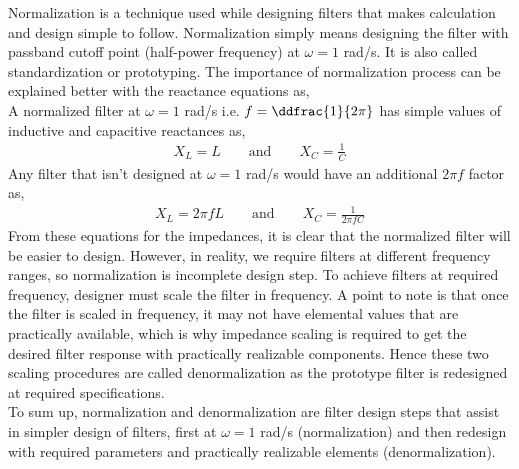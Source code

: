 
    Normalization is a technique used while designing filters that makes calculation and design simple to follow. Normalization simply means designing the filter with passband cutoff point (half-power frequency) at $\omega=1$ rad/s. It is also called standardization or prototyping. The importance of normalization process can be explained better with the reactance equations as,
\\ A normalized filter at $\omega=1$ rad/s i.e. $f=\ddfrac{1}{2\pi}$ has simple values of inductive and capacitive reactances as,
\begin{equation*}
    \begin{aligned}
        X_L=L \quad \quad \text{and} \quad \quad X_C=\frac{1}{C}
    \end{aligned}
\end{equation*}
Any filter that isn't designed at $\omega=1$ rad/s would have an additional $2\pi f$ factor as,
\begin{equation*}
    \begin{aligned}
        X_L=2\pi fL \quad \quad \text{and} \quad \quad X_C=\frac{1}{2\pi fC}
    \end{aligned}
\end{equation*}
From these equations for the impedances, it is clear that the normalized filter will be easier to design. However, in reality, we require filters at different frequency ranges, so normalization is incomplete design step. To achieve filters at required frequency, designer must scale the filter in frequency. A point to note is that once the filter is scaled in frequency, it may not have elemental values that are practically available, which is why impedance scaling is required to get the desired filter response with practically realizable components. Hence these two scaling procedures are called denormalization as the prototype filter is redesigned at required specifications.\\ 
To sum up, normalization and denormalization are filter design steps that assist in simpler design of filters, first at $\omega=1$ rad/s (normalization) and then redesign with required parameters and practically realizable elements (denormalization).